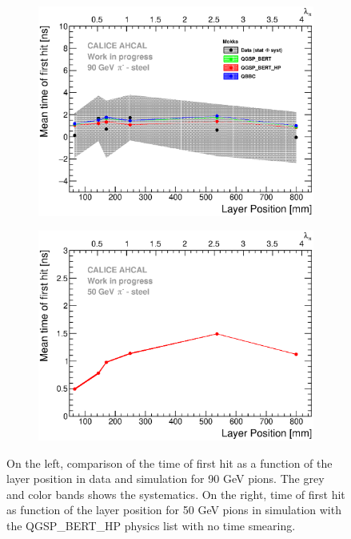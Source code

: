 \begin{figure}[htbp!]
	\begin{subfigure}[t]{0.49\textwidth}
		\centering
		\includegraphics[width=1\textwidth]{../Thesis_Plots/Timing/Pions/Plots/ComparisonToSim/Time_Depth_90GeV_Mokka.eps}
		\caption{} \label{fig:Depth_SimData_Comparison}
	\end{subfigure}
	\hfill
	\begin{subfigure}[t]{0.49\textwidth}
		\centering
		\includegraphics[width=1\textwidth]{../Thesis_Plots/Timing/Pions/Plots/Time_Depth_50GeV_QGSP_BERT_HP_noSmearing.eps}
		\caption{}\label{fig:Depth_Sim_noSmearing}
	\end{subfigure}
	\caption{On the left, comparison of the time of first hit as a function of the layer position in data and \mokka simulation for 90 GeV pions. The grey and color bands shows the systematics. On the right, time of first hit as function of the layer position for 50 GeV pions in simulation with the QGSP\_BERT\_HP physics list with no time smearing.}
\end{figure}

